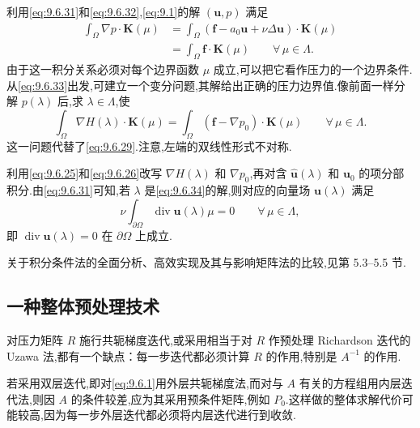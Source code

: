 利用\eqref{eq:9.6.31}和\eqref{eq:9.6.32},\eqref{eq:9.1}的解 \((\boldsymbol{u},p)\) 满足
\begin{equation}\label{eq:9.6.33}
  \begin{aligned}
    \int_\Omega\nabla p\cdot\boldsymbol{K}(\mu)
      &=\int_\Omega(\boldsymbol{f}-a_0\boldsymbol{u}+\nu\Delta\boldsymbol{u})\cdot\boldsymbol{K}(\mu)\\
      &=\int_\Omega\boldsymbol{f}\cdot\boldsymbol{K}(\mu)\qquad\forall\,\mu\in\Lambda .
  \end{aligned}
\end{equation}
由于这一积分关系必须对每个边界函数 \(\mu\) 成立,可以把它看作压力的一个边界条件.从\eqref{eq:9.6.33}出发,可建立一个变分问题,其解给出正确的压力边界值.像前面一样分解 \(p(\lambda)\) 后,求 \(\lambda\in\Lambda\),使
\begin{equation}\label{eq:9.6.34}
  \int_\Omega\nabla H(\lambda)\cdot\boldsymbol{K}(\mu)
   =\int_\Omega(\boldsymbol{f}-\nabla p_0)\cdot\boldsymbol{K}(\mu)\qquad\forall\,\mu\in\Lambda.
\end{equation}
这一问题代替了\eqref{eq:9.6.29}.注意,左端的双线性形式不对称.

利用\eqref{eq:9.6.25}和\eqref{eq:9.6.26}改写 \(\nabla H(\lambda)\) 和 \(\nabla p_0\),再对含 \(\widehat{\boldsymbol{u}}(\lambda)\) 和 \(\boldsymbol{u}_0\) 的项分部积分.由\eqref{eq:9.6.31}可知,若 \(\lambda\) 是\eqref{eq:9.6.34}的解,则对应的向量场 \(\boldsymbol{u}(\lambda)\) 满足
\begin{equation}\label{eq:9.6.35}
  \nu\int_{\partial\Omega}\operatorname{div}\boldsymbol{u}(\lambda)\mu=0\qquad\forall\,\mu\in\Lambda,
\end{equation}
即 \(\operatorname{div}\boldsymbol{u}(\lambda)=0\) 在 \(\partial\Omega\) 上成立.

关于积分条件法的全面分析、高效实现及其与影响矩阵法的比较,见第 5.3–5.5 节.

\subsection{一种整体预处理技术}\label{sec:9.6.7}

对压力矩阵 \(R\) 施行共轭梯度迭代,或采用相当于对 \(R\) 作预处理 Richardson 迭代的 Uzawa 法,都有一个缺点：每一步迭代都必须计算 \(R\) 的作用,特别是 \(A^{-1}\) 的作用.

若采用双层迭代,即对\eqref{eq:9.6.1}用外层共轭梯度法,而对与 \(A\) 有关的方程组用内层迭代法,则因 \(A\) 的条件较差,应为其采用预条件矩阵,例如 \(P_0\).这样做的整体求解代价可能较高,因为每一步外层迭代都必须将内层迭代进行到收敛.

